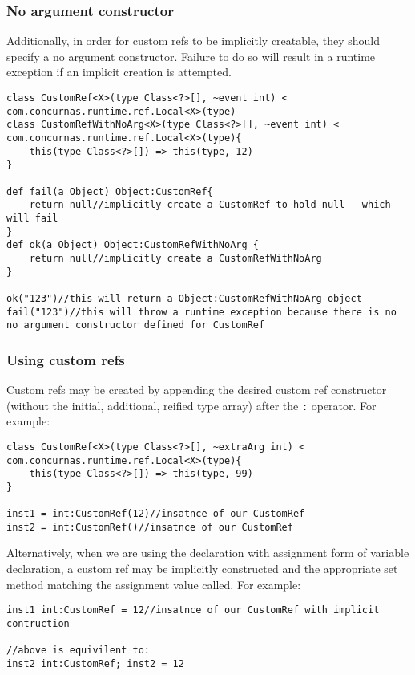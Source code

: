 \documentclass[conc-doc]{subfiles}
\begin{document}
\subsubsection{No argument constructor}
Additionally, in order for custom refs to be implicitly creatable, they should specify a no argument constructor. Failure to do so will result in a runtime exception if an implicit creation is attempted.

\begin{lstlisting}
class CustomRef<X>(type Class<?>[], ~event int) < com.concurnas.runtime.ref.Local<X>(type)
class CustomRefWithNoArg<X>(type Class<?>[], ~event int) < com.concurnas.runtime.ref.Local<X>(type){
	this(type Class<?>[]) => this(type, 12)
}

def fail(a Object) Object:CustomRef{
	return null//implicitly create a CustomRef to hold null - which will fail
}
def ok(a Object) Object:CustomRefWithNoArg {
	return null//implicitly create a CustomRefWithNoArg
}

ok("123")//this will return a Object:CustomRefWithNoArg object
fail("123")//this will throw a runtime exception because there is no no argument constructor defined for CustomRef
\end{lstlisting}


\subsubsection{Using custom refs}
Custom refs may be created by appending the desired custom ref constructor (without the initial, additional, reified type array) after the \lstinline{:} operator. For example:

\begin{lstlisting}
class CustomRef<X>(type Class<?>[], ~extraArg int) < com.concurnas.runtime.ref.Local<X>(type){
	this(type Class<?>[]) => this(type, 99)
}

inst1 = int:CustomRef(12)//insatnce of our CustomRef
inst2 = int:CustomRef()//insatnce of our CustomRef
\end{lstlisting}

Alternatively, when we are using the declaration with assignment form of variable declaration, a custom ref may be implicitly constructed and the appropriate set method matching the assignment value called. For example:

\begin{lstlisting}
inst1 int:CustomRef = 12//insatnce of our CustomRef with implicit contruction

//above is equivilent to:
inst2 int:CustomRef; inst2 = 12
\end{lstlisting}
\end{document}
